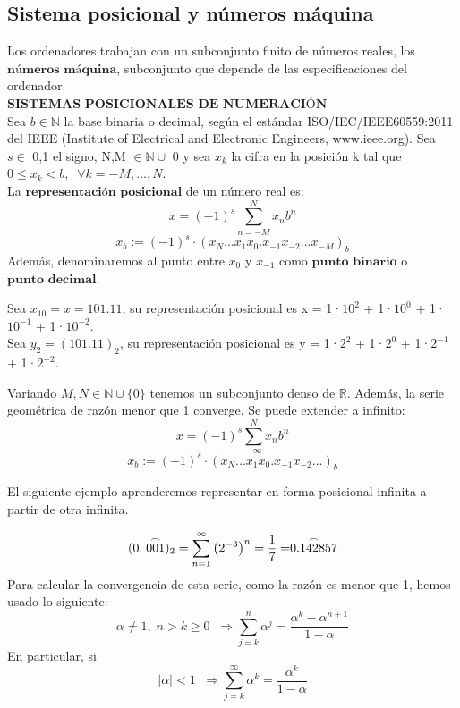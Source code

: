 \subsection{Sistema posicional y números máquina}
Los ordenadores trabajan con un subconjunto finito de números reales, los $\textbf{números máquina}$, subconjunto que depende de las especificaciones del ordenador.\\

$\textbf{SISTEMAS POSICIONALES DE NUMERACIÓN}$\\
Sea $b \in \mathbb{N}$ la base binaria o decimal, según el estándar ISO/IEC/IEEE60559:2011 del IEEE (Institute of Electrical and Electronic Engineers, www.ieee.org). Sea $s \in$ {0,1} el signo, N,M $\in \mathbb{N} \cup$ {0} y sea $x_k$ la cifra en la posición k tal que $0 \leq x_k < b, \; \; \forall k = -M, ..., N$.\\
La $\textbf{representación posicional}$ de un número real es:
\[ x = (-1)^s \sum_{n=-M}^N x_nb^n \]
\[ x_b := (-1)^s \cdot (x_N...x_1x_0.x_{-1}x_{-2}...x_{-M})_b \]
Además, denominaremos al punto entre $x_0$ y $x_{-1}$ como $\textbf{punto binario}$ o $\textbf{punto decimal}$.

\begin{ejemplo}
Sea $x_{10} = x = 101.11$, su representación posicional es x = 1·$10^2$ + 1·$10^0$ + 1·$10^{-1}$ + 1·$10^{-2}$.\\
Sea $y_2 = (101.11)_2$, su representación posicional es y = 1·$2^2$ + 1·$2^0$ + 1·$2^{-1}$ + 1·$2^{-2}$.
\end{ejemplo}

Variando $M, N \in \mathbb{N} \cup \lbrace 0 \rbrace $ tenemos un subconjunto denso de $\mathbb{R}$. Además, la serie geométrica de razón menor que 1 converge. Se puede extender a infinito:
\[ x = (-1)^s \sum_{- \infty}^N x_nb^n \]
\[ x_b := (-1)^s \cdot (x_N...x_1x_0.x_{-1}x_{-2}...)_b \]

El siguiente ejemplo aprenderemos representar en forma posicional infinita a partir de otra infinita.

\begin{ejemplo}
\[ (0.\stackrel{\large \frown}{001}) _2 = \sum_{n=1}^{\infty} \left( 2^{-3} \right) ^n = \frac{1}{7} = \stackrel{\Large \frown}{0.142857} \]
Para calcular la convergencia de esta serie, como la razón es menor que 1, hemos usado lo siguiente:
\[ \alpha \neq 1, \; n > k \geq 0 \; \; \Rightarrow \sum_{j=k}^n \alpha ^j = \frac{\alpha ^k - \alpha ^{n+1}}{1 - \alpha} \]
En particular, si \[ \vert \alpha \vert < 1 \; \; \Rightarrow  \sum_{j=k}^\infty \alpha ^k = \frac{\alpha ^k}{1 - \alpha} \]
\end{ejemplo}


